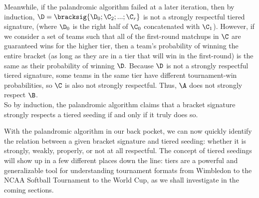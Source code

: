 {{        Meanwhile, if the palandromic algorithm failed at a later iteration, then by induction, $\D = \bracksig{\D_0; \C_2; ...; \C_{r}}$ is not a strongly respectful tiered signature, (where $\D_0$ is the right half of $\C_0$ concatenated with $\C_1$). However, if we consider a set of teams such that all of the first-round matchups in $\C$ are guaranteed wins for the higher tier, then a team's probability of winning the entire bracket (as long as they are in a tier that will win in the first-round) is the same as their probability of winning $\D.$ Because $\D$ is not a strongly respectful tiered signature, some teams in the same tier have different tournament-win probabilities, so $\C$ is also not strongly respectful. Thus, $\A$ does not strongly respect $\B$.\\

        So by induction, the palandromic algorithm claims that a bracket signature strongly respects a tiered seeding if and only if it truly does so.
    }{}

    With the palandromic algorithm in our back pocket, we can now quickly identify the relation between a given bracket signature and tiered seeding: whether it is strongly, weakly, properly, or not at all respectful. The concept of tiered seedings will show up in a few different places down the line: tiers are a powerful and generalizable tool for understanding tournament formats from Wimbledon to the NCAA Softball Tournament to the World Cup, as we shall investigate in the coming sections.
}